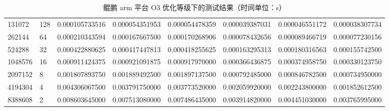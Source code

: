 \documentclass[a4paper]{article}
\begin{document}
\begin{table}[]
{\begin{tabular}{llllllll}
      131072  & 128     & 0.000105733516 & 0.000054351953 & 0.000054478359  & 0.000039387031 & 0.000046551172 & 0.000038307734 \\
      262144  & 64      & 0.000210343594 & 0.000167667500 & 0.000170268906  & 0.000078432656 & 0.000089466719 & 0.000077230156 \\
      524288  & 32      & 0.000422880625 & 0.000417447813 & 0.000418255625  & 0.000163295313 & 0.000180316563 & 0.000155742500 \\
      1048576 & 16      & 0.000911424375 & 0.000921091875 & 0.000917970000  & 0.000366436875 & 0.000374958750 & 0.000330123750 \\
      2097152 & 8       & 0.001807893750 & 0.001889492500 & 0.001897137500  & 0.000792485000 & 0.000846782500 & 0.000734950000 \\
      4194304 & 4       & 0.004306067500 & 0.003791750000 & 0.003773520000  & 0.002059920000 & 0.002243800000 & 0.001852612500 \\
      8388608 & 2       & 0.008603645000 & 0.007513080000 & 0.007486435000  & 0.003914820000 & 0.004451030000 & 0.003765995000
    \end{tabular}%
  }
  \caption{鲲鹏 arm 平台 O3 优化等级下的测试结果（时间单位：s）}
  \label{tab:arm-O3-test}
\end{table}
\end{document}
